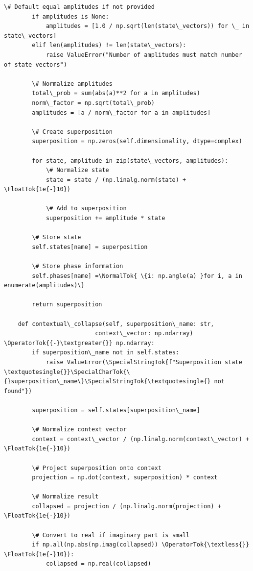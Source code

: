 \documentclass[12pt]{article}
\begin{document}
\begin{lstlisting}[basicstyle=\ttfamily\small]
        \# Default equal amplitudes if not provided
        if amplitudes is None:
            amplitudes = [1.0 / np.sqrt(len(state\_vectors)) for \_ in state\_vectors]
        elif len(amplitudes) != len(state\_vectors):
            raise ValueError("Number of amplitudes must match number of state vectors")
        
        \# Normalize amplitudes
        total\_prob = sum(abs(a)**2 for a in amplitudes)
        norm\_factor = np.sqrt(total\_prob)
        amplitudes = [a / norm\_factor for a in amplitudes]
        
        \# Create superposition
        superposition = np.zeros(self.dimensionality, dtype=complex)
        
        for state, amplitude in zip(state\_vectors, amplitudes):
            \# Normalize state
            state = state / (np.linalg.norm(state) + \FloatTok{1e{-}10})
            
            \# Add to superposition
            superposition += amplitude * state
        
        \# Store state
        self.states[name] = superposition
        
        \# Store phase information
        self.phases[name] =\NormalTok{ \{i: np.angle(a) }for i, a in enumerate(amplitudes)\}
        
        return superposition
    
    def contextual\_collapse(self, superposition\_name: str, 
                          context\_vector: np.ndarray) \OperatorTok{{-}\textgreater{}} np.ndarray:
        if superposition\_name not in self.states:
            raise ValueError(\SpecialStringTok{f"Superposition state \textquotesingle{}}\SpecialCharTok{\{}superposition\_name\}\SpecialStringTok{\textquotesingle{} not found"})
        
        superposition = self.states[superposition\_name]
        
        \# Normalize context vector
        context = context\_vector / (np.linalg.norm(context\_vector) + \FloatTok{1e{-}10})
        
        \# Project superposition onto context
        projection = np.dot(context, superposition) * context
        
        \# Normalize result
        collapsed = projection / (np.linalg.norm(projection) + \FloatTok{1e{-}10})
        
        \# Convert to real if imaginary part is small
        if np.all(np.abs(np.imag(collapsed)) \OperatorTok{\textless{}} \FloatTok{1e{-}10}):
            collapsed = np.real(collapsed)
        

\end{lstlisting}
\end{document}
